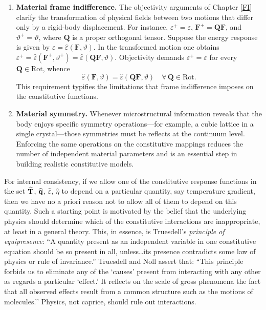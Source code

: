 \begin{enumerate}
	\item \textbf{Material frame indifference.}\;
	The objectivity arguments of Chapter \ref{FI} clarify the
	transformation of physical fields between two motions that differ
	only by a rigid‐body displacement.  For instance,
	\(\varepsilon^{+}=\varepsilon\),
	\(\mathbf{F}^{+}= \mathbf{Q}\mathbf{F}\), and
	\(\vartheta^{+}=\vartheta\),
	where \(\mathbf{Q}\) is a proper orthogonal tensor.
	Suppose the energy response is given by
	\(\varepsilon = \widehat{\varepsilon}(\mathbf{F},\vartheta)\).
	In the transformed motion one obtains
	\(\varepsilon^{+} =
	\widehat{\varepsilon}(\mathbf{F}^{+},\vartheta^{+}) =
	\widehat{\varepsilon}(\mathbf{Q}\mathbf{F},\vartheta)\).
	Objectivity demands \(\varepsilon^{+}=\varepsilon\) for every
	\(\mathbf{Q}\in\mathrm{Rot}\), whence
	\[
	\widehat{\varepsilon}(\mathbf{F},\vartheta) =
	\widehat{\varepsilon}(\mathbf{Q}\mathbf{F},\vartheta)
	\quad
	\forall\,\mathbf{Q}\in\mathrm{Rot}.
	\]
	This requirement typifies the limitations that frame indifference
	imposes on the constitutive functions.
	
	\item \textbf{Material symmetry.}\;
	Whenever microstructural information reveals that the body enjoys
	specific symmetry operations—for example, a cubic lattice in a
	single crystal—those symmetries must be reflects at the continuum
	level.  Enforcing the same operations on the constitutive mappings
	reduces the number of independent material parameters and is an
	essential step in building realistic constitutive models.
\end{enumerate}

\begin{remark}
	For internal consistency, if we allow one of the constitutive response
	functions in the set $\widehat{\mathbf{T}}$, $\widehat{\mathbf{q}}$, $\widehat{\varepsilon}$, $\widehat{\eta}$  to depend on a particular quantity, say temperature gradient,
	then we have no a priori reason not to allow all of them to depend on this quantity. Such a starting point is motivated by the belief that the underlying physics should determine which of the constitutive interactions are
	inappropriate, at least in a general theory. This, in essence, is Truesdell’s \textit{principle of equipresence}: ``A
	quantity present as an independent variable in one constitutive equation should be so present in all,
	unless\ldots its presence contradicts some law of physics or rule of invariance.''  Truesdell and Noll
	assert that: ``This principle forbids us to eliminate any of the `causes’ present from
	interacting with any other as regards a particular `effect.’ It reflects on the scale of gross phenomena the
	fact that all observed effects result from a common structure such as the motions of molecules.'' Physics,
	not caprice, should rule out interactions.
\end{remark}


